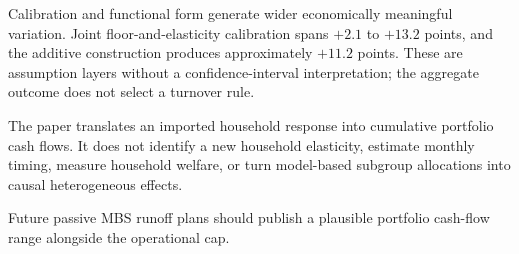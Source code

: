 Calibration and functional form generate wider economically meaningful variation. Joint floor-and-elasticity calibration spans $+2.1$ to $+13.2$ points, and the additive construction produces approximately $+11.2$ points. These are assumption layers without a confidence-interval interpretation; the aggregate outcome does not select a turnover rule.

The paper translates an imported household response into cumulative portfolio cash flows. It does not identify a new household elasticity, estimate monthly timing, measure household welfare, or turn model-based subgroup allocations into causal heterogeneous effects.

Future passive MBS runoff plans should publish a plausible portfolio cash-flow range alongside the operational cap.
